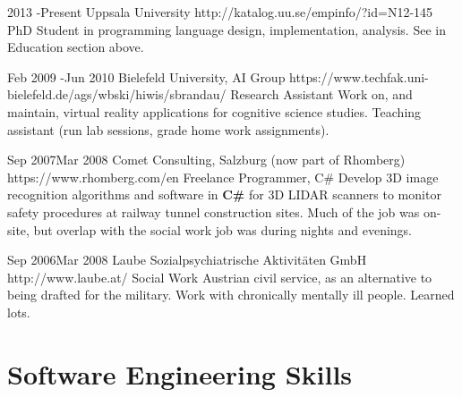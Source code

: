 \documentclass[10pt]{article} %
\begin{document}
\job
{2013 -}{Present}
{Uppsala University}
{http://katalog.uu.se/empinfo/?id=N12-145}
{PhD Student in programming language design, implementation, analysis.}
{See in Education section above.}


\job
{Feb 2009 -}{Jun 2010}
{Bielefeld University, AI Group}
{https://www.techfak.uni-bielefeld.de/ags/wbski/hiwis/sbrandau/}
{Research Assistant}
{Work on, and maintain, virtual reality applications for cognitive science
  studies. Teaching assistant (run lab sessions, grade home work assignments).}


\job
{Sep 2007}{Mar 2008}
{Comet Consulting, Salzburg (now part of Rhomberg)}
{https://www.rhomberg.com/en}
{Freelance Programmer, C\#}
{Develop 3D image recognition algorithms and software in \textbf{C\#} for 3D
  LIDAR scanners to monitor safety procedures at railway tunnel construction
  sites. Much of the job was on-site, but overlap with the social work job was
  during nights and evenings.}


\job
{Sep 2006}{Mar 2008}
{Laube Sozialpsychiatrische Aktivitäten GmbH}
{http://www.laube.at/}
{Social Work}
{Austrian civil service, as an alternative to being drafted for the military.
  Work with chronically mentally ill people. Learned lots.}


\section{Software Engineering Skills}

\end{document}

